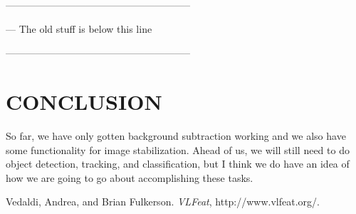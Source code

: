 \documentclass[a4paper, 10pt, conference]{ieeeconf}      %
\begin{document}
--------------------------------------------------------

--- The old stuff is below this line

--------------------------------------------------------





\section{CONCLUSION}
So far, we have only gotten background subtraction working and we also have some functionality for image stabilization. Ahead of us, we will still need to do object detection, tracking, and classification, but I think we do have an idea of how we are going to go about accomplishing these tasks. 













\begin{thebibliography}{99}

Vedaldi, Andrea, and Brian Fulkerson. {\it VLFeat}, http://www.vlfeat.org/.



\end{thebibliography}
\end{document}
